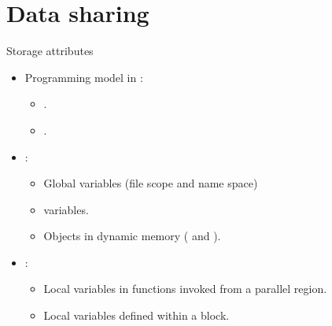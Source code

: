\section{Data sharing}

\begin{frame}[t]{Storage attributes}
\begin{itemize}
  \item Programming model in :
    \begin{itemize}
      \item {}.
      \item {}.
    \end{itemize}

  \item {}:
    \begin{itemize}
      \item Global variables (file scope and name space)
      \item {} variables.
      \item Objects in dynamic memory ( and ).
    \end{itemize}

  \item {}:
    \begin{itemize}
      \item Local variables in functions invoked from a parallel region.
      \item Local variables defined within a block.
    \end{itemize}
\end{itemize}
\end{frame}

